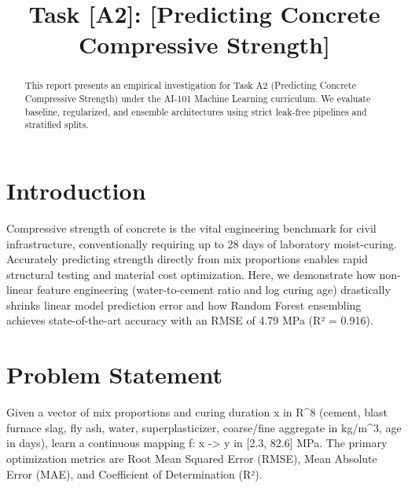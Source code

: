 \documentclass[conference]{IEEEtran}
\begin{document}
\title{Task [A2]: [Predicting Concrete Compressive Strength]}

\author{
}

\maketitle

\begin{abstract}
This report presents an empirical investigation for Task A2 (Predicting Concrete Compressive Strength) under the AI-101 Machine Learning curriculum. We evaluate baseline, regularized, and ensemble architectures using strict leak-free pipelines and stratified splits.
\end{abstract}

\section{Introduction}
Compressive strength of concrete is the vital engineering benchmark for civil infrastructure, conventionally requiring up to 28 days of laboratory moist-curing. Accurately predicting strength directly from mix proportions enables rapid structural testing and material cost optimization. Here, we demonstrate how non-linear feature engineering (water-to-cement ratio and log curing age) drastically shrinks linear model prediction error and how Random Forest ensembling achieves state-of-the-art accuracy with an RMSE of 4.79 MPa (R² = 0.916).

\section{Problem Statement}
Given a vector of mix proportions and curing duration x in R^8 (cement, blast furnace slag, fly ash, water, superplasticizer, coarse/fine aggregate in kg/m^3, age in days), learn a continuous mapping f: x -> y in [2.3, 82.6] MPa. The primary optimization metrics are Root Mean Squared Error (RMSE), Mean Absolute Error (MAE), and Coefficient of Determination (R²).
\end{document}
